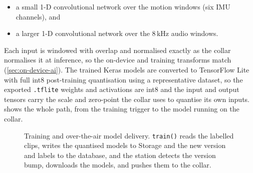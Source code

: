 \begin{itemize}[leftmargin=1.5em]
  \item a small 1-D convolutional network over the motion windows (six IMU channels), and
  \item a larger 1-D convolutional network over the 8\,kHz audio windows.
\end{itemize}

Each input is windowed with overlap and normalised exactly as the collar normalises it at inference,
so the on-device and training transforms match (\cref{sec:on-device-ai}). The trained Keras models are
converted to TensorFlow Lite with full int8 post-training quantisation using a representative dataset,
so the exported \texttt{.tflite} weights and activations are int8 and the input and output tensors
carry the scale and zero-point the collar uses to quantise its own inputs. 
shows the whole path, from the training trigger to the model running on the collar.

\begin{figure}[ht]
  \centering
  \caption{Training and over-the-air model delivery. \texttt{train()} reads the labelled clips, writes
           the quantised models to Storage and the new version and labels to the database, and the
           station detects the version bump, downloads the models, and pushes them to the collar.}
  \label{fig:training-flow}
\end{figure}

